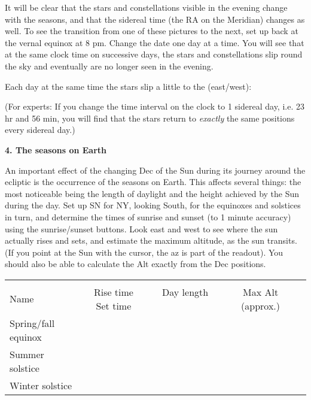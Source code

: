         \begin{figure*}[h]
        \centerline{}
        \caption{}
         \end{figure*}

It will be clear that the stars and constellations visible in the
evening change with the seasons, and that the sidereal time (the RA on
the Meridian) changes as well.  To see the transition from one of
these pictures to the next, set up back at the vernal equinox at 8
pm. Change the date one day at a time. You will see that at the same
clock time on successive days, the stars and constellations slip round
the sky and eventually are no longer seen in the evening.

\medskip  
Each day at the same time the stars slip a little to the (east/west):
\makebox[2cm]{\hrulefill}

\bigskip
(For experts: If you change the time interval on the clock to 1
sidereal day, i.e. 23 hr and 56 min, you will find that the stars
return to \emph{exactly} the same positions every sidereal day.)


\medskip 
\bigskip

\noindent
{\bf 4. The seasons on Earth}

\medskip
\noindent
An important effect of the changing Dec of the Sun during its journey
around the ecliptic is the occurrence of the seasons on Earth. This
affects several things: the most noticeable being the length of
daylight and the height achieved by the Sun during the day.  Set up SN
for NY, looking South, for the equinoxes and solstices in turn, and
determine the times of sunrise and sunset (to 1 minute accuracy) using
the sunrise/sunset buttons. Look east and west to see where the sun
actually rises and sets, and estimate the maximum altitude, as the sun
transits. (If you point at the Sun with the cursor, the az is part of
the readout). You should also be able to calculate the Alt exactly
from the Dec positions. 

\begin{center}
\begin{tabular}{lcccc} \hline \\ [-6pt]
Name & \hspace{0.5cm} Rise time \hspace{0.7cm} Set time \hspace{1cm}
 & Day length \ \ \ \ \ \ \ \ &
Max Alt (approx.)  \hspace{1cm}\\ [6pt]
\hline
Spring/fall equinox &   &  & &     \\ \hline
Summer solstice & & & &  \\ \hline
Winter solstice  & & & &  \\ \hline
\end{tabular}
\end{center}

